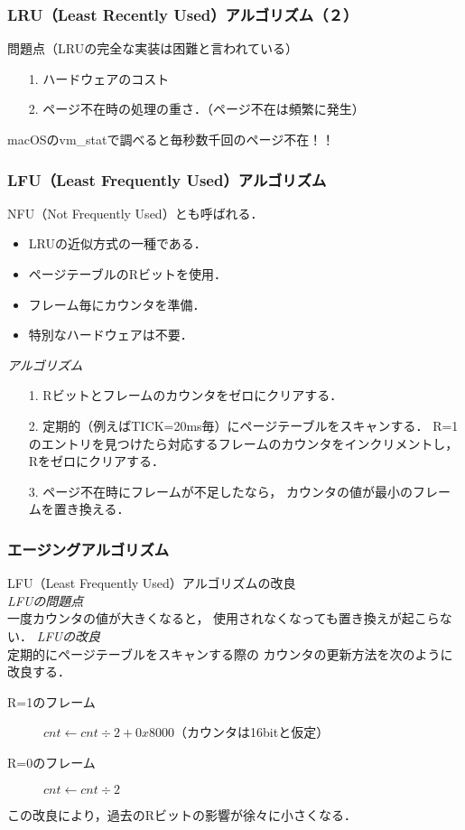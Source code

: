 \documentclass[unicode]{beamer}                   %
\begin{document}
\begin{frame}
  \frametitle{LRU（Least Recently Used）アルゴリズム（２）}
  \vspace{3mm}問題点（LRUの完全な実装は困難と言われている）\\
  \begin{enumerate}
  \item[1.] ハードウェアのコスト
  \item[2.] ページ不在時の処理の重さ．（ページ不在は頻繁に発生）
  \end{enumerate}
  macOSのvm\_statで調べると毎秒数千回のページ不在！！
\end{frame}

\begin{frame}
  \frametitle{LFU（Least Frequently Used）アルゴリズム}
  NFU（Not Frequently Used）とも呼ばれる．
  \begin{itemize}
  \item LRUの近似方式の一種である．
  \item ページテーブルのRビットを使用．
  \item フレーム毎にカウンタを準備．
  \item 特別なハードウェアは不要．
  \end{itemize}
  \vfill
  \emph{アルゴリズム}
  \begin{enumerate}
  \item[1.] Rビットとフレームのカウンタをゼロにクリアする．
  \item[2.] 定期的（例えばTICK=20ms毎）にページテーブルをスキャンする．
    R=1のエントリを見つけたら対応するフレームのカウンタをインクリメントし，
    Rをゼロにクリアする．
  \item[3.] ページ不在時にフレームが不足したなら，
    カウンタの値が最小のフレームを置き換える．
  \end{enumerate}
\end{frame}

\begin{frame}
  \frametitle{エージングアルゴリズム}
  LFU（Least Frequently Used）アルゴリズムの改良\\
  \vfill
  \emph{LFUの問題点}\\
  一度カウンタの値が大きくなると，
  使用されなくなっても置き換えが起こらない．
  \vfill
  \emph{LFUの改良}\\
  定期的にページテーブルをスキャンする際の
  カウンタの更新方法を次のように改良する．
  \begin{description}
  \item[R=1のフレーム]
    $cnt \leftarrow cnt \div 2 + 0x8000$（カウンタは16bitと仮定）
  \item[R=0のフレーム]
    $cnt \leftarrow cnt \div 2$
  \end{description}
  この改良により，過去のRビットの影響が徐々に小さくなる．
\end{frame}
\end{document}
